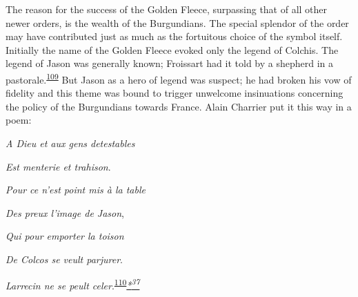 The reason for the success of the Golden Fleece, surpassing that of all
other newer orders, is the wealth of the Burgundians. The special
splendor of the order may have contributed just as much as the
fortuitous choice of the symbol itself. Initially the name of the Golden
Fleece evoked only the legend of Colchis. The legend of Jason was
generally known; Froissart had it told by a shepherd in a
pastorale.\textsuperscript{\protect\hypertarget{10_Chapter_Three__THE_HEROIC_DREAM.xhtmlux5cux23id_1717}{\protect\hyperlink{23_NOTES.xhtmlux5cux23id_1718}{109}}}
But Jason as a hero of legend was suspect; he had broken his vow of
fidelity and this theme was bound to trigger unwelcome insinuations
concerning the policy of the Burgundians towards France. Alain Charrier
put it this way in a poem:

\emph{A Dieu et aux gens detestables}

\emph{Est menterie et trahison}.

\emph{Pour ce n'est point mis à la table}

\emph{Des preux l'image de Jason},

\emph{Qui pour emporter la toison}

\emph{De Colcos se veult parjurer}.

\emph{Larrecin ne se peult
celer}.\textsuperscript{\protect\hypertarget{10_Chapter_Three__THE_HEROIC_DREAM.xhtmlux5cux23id_1715}{\protect\hyperlink{23_NOTES.xhtmlux5cux23id_1716}{110}}}\emph{\protect\hypertarget{10_Chapter_Three__THE_HEROIC_DREAM.xhtmlux5cux23id_2535}{\protect\hyperlink{23_NOTES.xhtmlux5cux23id_2536}{*\textsuperscript{37}}}}

